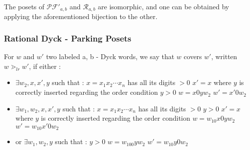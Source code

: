 \begin{rem}
    The posets of $\mathcal{PF'}_{a,b}$ and $\mathcal{R}_{a,b}$
    are isomorphic, and one can be obtained by
    applying the aforementioned bijection to the other.
\end{rem}

\subsubsection{Rational Dyck - Parking Posets}

\begin{definition}[$\gtrdot_{lr}$]
    For $w$ and $w'$ two labeled a, b - Dyck words, we say
    that $w$ covers $w'$, written $w \gtrdot_{lr} w'$,
    if either :
    \begin{itemize}
        \item $\exists w_2, x, x', y$ such that :
            \subitem $x = x_1x_2 \cdots x_n$ has all 
            its digits $> 0$
            \subitem $x' = x$ where $y$ is correctly
            inserted regarding the order condition
            \subitem $y > 0$
            \subitem $w = x0yw_2$
            \subitem $w' = x'0w_2$
        \item $\exists w_1, w_2, x, x', y$ such that :
            \subitem $x = x_1x_2 \cdots x_n$ has all 
                its digits $> 0$
            \subitem $y > 0$
            \subitem $x' = x$ where $y$ is correctly
                inserted regarding the order condition
            \subitem $w = w_10x0yw_2$
            \subitem $w' = w_10x'0w_2$
        \item or $\exists w_1, w_2, y$ such that :
            \subitem $y > 0$
            \subitem $w = w_100yw_2$
            \subitem $w' = w_10y0w_2$
    \end{itemize}  
\end{definition}

